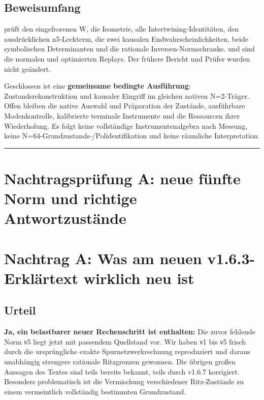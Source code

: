\subsection{Beweisumfang}\label{beweisumfang}

 prüft den eingefrorenen W, die Isometrie,
alle Intertwining-Identitäten, den ausdrücklichen n5-Leckterm, die zwei
kausalen Endwahrscheinlichkeiten, beide symbolischen Determinanten und
die rationale Inversen-Normschranke.  und
 sind die normalen und optimierten Replays.
Der frühere Bericht und Prüfer wurden nicht geändert.

Geschlossen ist eine \textbf{gemeinsame bedingte Ausführung}:
Zustandsrekonstruktion und kausaler Eingriff im gleichen nativen
N=2-Träger. Offen bleiben die native Auswahl und Präparation der
Zustände, ausführbare Modenkontrolle, kalibrierte terminale Instrumente
und die Ressourcen ihrer Wiederholung. Es folgt keine vollständige
Instrumentenalgebra nach Messung, keine
N=64-Grundzustands-/Polidentifikation und keine räumliche
Interpretation.

\begin{center}\rule{0.5\linewidth}{0.5pt}\end{center}

\section{Nachtragsprüfung A: neue fünfte Norm und richtige
Antwortzustände}\label{nachtragspruxfcfung-a-neue-fuxfcnfte-norm-und-richtige-antwortzustuxe4nde}

\section{Nachtrag A: Was am neuen v1.6.3-Erklärtext wirklich neu
ist}\label{nachtrag-a-was-am-neuen-v1.6.3-erkluxe4rtext-wirklich-neu-ist}

\subsection{Urteil}\label{urteil}

\textbf{Ja, ein belastbarer neuer Rechenschritt ist enthalten:} Die
zuvor fehlende Norm ν5 liegt jetzt mit passendem Quellstand vor. Wir
haben ν1 bis ν5 frisch durch die ursprüngliche exakte
Spurnetzwerkrechnung reproduziert und daraus unabhängig strengere
rationale Ritzgrenzen gewonnen. Die übrigen großen Aussagen des Textes
sind teils bereits bekannt, teils durch v1.6.7 korrigiert. Besonders
problematisch ist die Vermischung verschiedener Ritz-Zustände zu einem
vermeintlich vollständig bestimmten Grundzustand.

